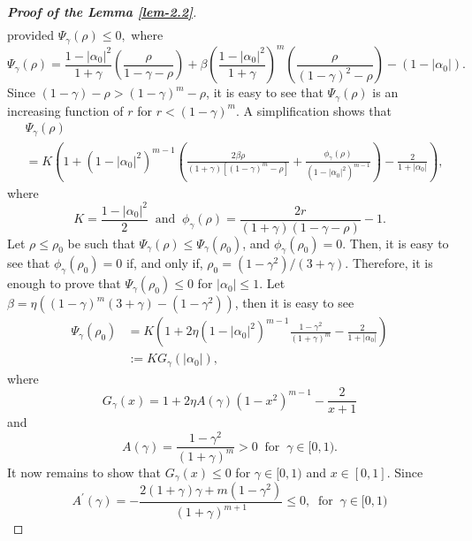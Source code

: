 \documentclass[a4paper,12pt]{amsart}
\theoremstyle{plain}
\theoremstyle{definition}
\begin{document}
\begin{proof}[\bf Proof of the Lemma \ref{lem-2.2}]
\begin{align}
	\end{align}
	provided $ \Psi_{\gamma}(\rho)\leq 0, $ where 
	\begin{equation*}
		\Psi_{\gamma}(\rho)=\frac{1-|\alpha_0|^2}{1+\gamma}\left(\frac{\rho}{1-\gamma-\rho}\right)+\beta\left(\frac{1-|\alpha_0|^2}{1+\gamma}\right)^m\left(\frac{\rho}{(1-\gamma)^2-\rho}\right)-(1-|\alpha_0|).
	\end{equation*}
	Since $ (1-\gamma)-\rho>(1-\gamma)^m-\rho $, it is easy to see that $ \Psi_{\gamma}(\rho) $ is an increasing function of $ r $ for $ r<(1-\gamma)^m. $ A simplification shows that 
	\begin{align*}&	\Psi_{\gamma}(\rho)\\&=K\left(1+(1-|\alpha_0|^2)^{m-1}\left(\frac{2\beta \rho}{(1+\gamma)[(1-\gamma)^m-\rho]}+\frac{\phi_{\gamma}(\rho)}{(1-|\alpha_0|^2)^{m-1}}\right)-\frac{2}{1+|\alpha_0|}\right),
	\end{align*}
	where 
	\begin{equation*}
		K=\frac{1-|\alpha_0|^2}{2}\;\; \text{and}\;\;\phi_{\gamma}(\rho)=\frac{2r}{(1+\gamma)(1-\gamma-\rho)}-1.
	\end{equation*}
	\noindent Let $ \rho\leq \rho_0 $ be such that $ \Psi_{\gamma}(\rho)\leq \Psi_{\gamma}(\rho_0) $, and $ \phi_{\gamma}(\rho_0)=0 $. Then, it is easy to see that $ \phi_{\gamma}(\rho_0)=0 $ if, and only if, $ \rho_0=(1-\gamma^2)/(3+\gamma). $
	Therefore, it is enough to prove that $ \Psi_{\gamma}(\rho_0)\leq 0 $ for $ |\alpha_0|\leq 1. $ 
	Let $ \beta=\eta\left((1-\gamma)^m(3+\gamma)-(1-\gamma^2)\right) $, then it is easy to see
	\begin{align*} 
		\Psi_{\gamma}(\rho_0)&=K\left(1+2\eta(1-|\alpha_0|^2)^{m-1}\frac{1-\gamma^2}{(1+\gamma)^m}-\frac{2}{1+|\alpha_0|}\right)\\&:=K G_{\gamma}(|\alpha_0|),
	\end{align*}
	where 
	\begin{equation}\label{e-3.4a}
		G_{\gamma}(x)=1+2\eta A(\gamma)(1-x^2)^{m-1}-\frac{2}{x+1}
	\end{equation}
	and
	\begin{equation*}
	A(\gamma)=\frac{1-\gamma^2}{(1+\gamma)^m}>0\;\;\text{for}\;\;\gamma\in [0,1).
	\end{equation*}
	It now remains to show that $ G_{\gamma}(x)\leq 0 $ for $ \gamma\in [0,1) $ and $ x\in [0,1]. $ Since
	\begin{equation*}
		A^{\prime}(\gamma)=-\frac{2(1+\gamma)\gamma+m(1-\gamma^2)}{(1+\gamma)^{m+1}}\leq 0,\;\;\text{for}\;\;\gamma\in [0,1)
	\end{equation*}

\end{proof}
\end{document}
